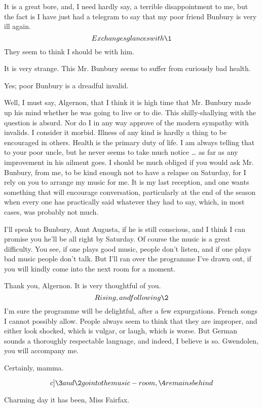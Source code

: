 \documentclass{book}
\begin{document}
\2  It is a great bore, and, I need hardly say, a terrible
disappointment to me, but the fact is I have just had a telegram to
say that my poor friend Bunbury is very ill again.     \[Exchanges
glances with \1\]      They seem to think I should be with him.

\3  It is very strange.  This Mr. Bunbury seems to
suffer from curiously bad health.

\2  Yes; poor Bunbury is a dreadful invalid.

\3  Well, I must say, Algernon, that I think it is
high time that Mr. Bunbury made up his mind whether he was going to
live or to die.  This shilly-shallying with the question is absurd.
Nor do I in any way approve of the modern sympathy with invalids.
I consider it morbid.  Illness of any kind is hardly a thing to be
encouraged in others.  Health is the primary duty of life.  I am
always telling that to your poor uncle, but he never seems to take
much notice \ldots{} as far as any improvement in his ailment goes.  I
should be much obliged if you would ask Mr. Bunbury, from me, to be
kind enough not to have a relapse on Saturday, for I rely on you to
arrange my music for me.  It is my last reception, and one wants
something that will encourage conversation, particularly at the end
of the season when every one has practically said whatever they had
to say, which, in most cases, was probably not much.

\2  I'll speak to Bunbury, Aunt Augusta, if he is still
conscious, and I think I can promise you he'll be all right by
Saturday.  Of course the music is a great difficulty.  You see, if
one plays good music, people don't listen, and if one plays bad
music people don't talk.  But I'll ran over the programme I've
drawn out, if you will kindly come into the next room for a moment.

\3  Thank you, Algernon.  It is very thoughtful of
you.  \[Rising, and following \2\]  I'm sure the programme
will be delightful, after a few expurgations.  French songs I
cannot possibly allow.  People always seem to think that they are
improper, and either look shocked, which is vulgar, or laugh, which
is worse.  But German sounds a thoroughly respectable language, and
indeed, I believe is so.  Gwendolen, you will accompany me.

\4  Certainly, mamma.

\[c]\3 and \2 go into the music-room,\\ \4 remains behind\]

\1  Charming day it has been, Miss Fairfax.
\end{document}

